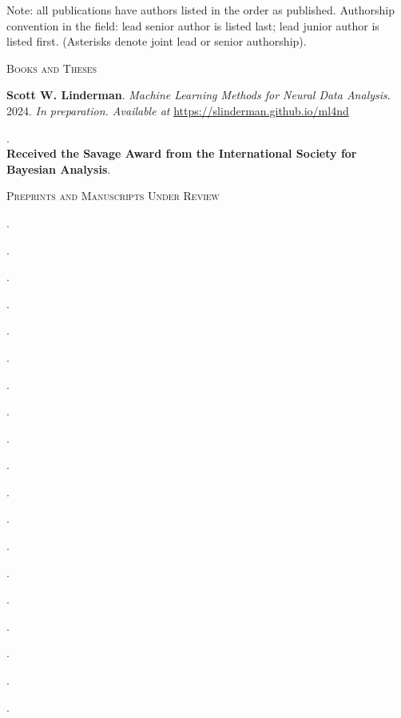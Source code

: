 \documentclass[10pt]{article}
\begin{document}
Note: all publications have authors listed in the order as published. Authorship convention in the field: lead senior author is listed last; lead junior author is listed first. (Asterisks denote joint lead or senior authorship).

\vspace{.5em}

{\small\scshape Books and Theses}
\begin{outerlist}
\item \textbf{Scott W. Linderman}. \textit{Machine Learning Methods for Neural Data Analysis}. 2024. \textit{In preparation. Available at} \url{https://slinderman.github.io/ml4nd}
\item {}. \\
  \textbf{Received the Savage Award from the International Society for Bayesian Analysis}. 
\end{outerlist}

\vspace{0.5em}

{\small\scshape Preprints and Manuscripts Under Review}
\begin{outerlist}
\item {}.
\item {}.
\item {}.
\item {}.
\item {}.
\item {}.
\item {}.
\item {}.
\item {}.
\item {}.
\item {}.
\item {}.
\item {}.
\item {}.
\item {}.
\item {}.
\item {}.
\item {}.
\item {}.
\end{outerlist}
\end{document}
